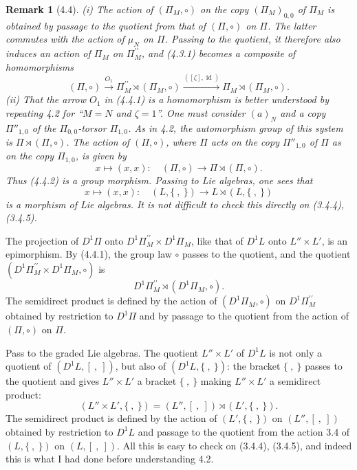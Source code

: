 \documentclass[10pt,a4paper]{article}
\newcommand{\Id}{\operatorname{id}}
\theoremstyle{deligne}
\newtheorem*{remark*}{Remark}
\newcommand{\heading}[1]{\vspace{0.65em}\noindent{\bfseries #1}\quad}
\begin{document}
\begin{remark*}[4.4]
(i) The action of \((\Pi_M,\circ)\) on the copy \((\Pi_M)_{0,0}\) of \(\Pi_M\) is obtained by passage to the quotient from that of \((\Pi,\circ)\) on \(\Pi\). The latter commutes with the action of \(\mu_N\) on \(\Pi\). Passing to the quotient, it therefore also induces an action of \(\Pi_M\) on \(\Pi_M^{\prime\prime}\), and (4.3.1) becomes a composite of homomorphisms
\[
\tag{4.4.1}
(\Pi,\circ)\overset{O_1}{\longrightarrow}\Pi_M^{\prime\prime}\rtimes(\Pi_M,\circ)
\overset{([\zeta],\Id)}{\longrightarrow}\Pi_M\rtimes(\Pi_M,\circ).
\]
(ii) That the arrow \(O_1\) in (4.4.1) is a homomorphism is better understood by repeating 4.2 for ``\(M=N\) and \(\zeta=1\)''. One must consider \((a)_N\) and a copy \(\Pi''_{1,0}\) of the \(\Pi_{0,0}\)-torsor \(\Pi_{1,0}\). As in 4.2, the automorphism group of this system is \(\Pi\rtimes(\Pi,\circ)\). The action of \((\Pi,\circ)\), where \(\Pi\) acts on the copy \(\Pi''_{1,0}\) of \(\Pi\) as on the copy \(\Pi_{1,0}\), is given by
\[
\tag{4.4.2}
x\longmapsto(x,x):\quad (\Pi,\circ)\longrightarrow\Pi\rtimes(\Pi,\circ).
\]
Thus (4.4.2) is a group morphism. Passing to Lie algebras, one sees that
\[
\tag{4.4.3}
x\longmapsto(x,x):\quad (L,\{\ ,\ \})\longrightarrow L\rtimes(L,\{\ ,\ \})
\]
is a morphism of Lie algebras. It is not difficult to check this directly on (3.4.4), (3.4.5).
\end{remark*}

\heading{4.5.} The projection of \(D^1\Pi\) onto \(D^1\Pi_M^{\prime\prime}\times D^1\Pi_M\), like that of \(D^1L\) onto \(L''\times L'\), is an epimorphism. By (4.4.1), the group law \(\circ\) passes to the quotient, and the quotient \((D^1\Pi_M^{\prime\prime}\times D^1\Pi_M,\circ)\) is
\[
D^1\Pi_M^{\prime\prime}\rtimes(D^1\Pi_M,\circ).
\]
The semidirect product is defined by the action of \((D^1\Pi_M,\circ)\) on \(D^1\Pi_M^{\prime\prime}\) obtained by restriction to \(D^1\Pi\) and by passage to the quotient from the action of \((\Pi,\circ)\) on \(\Pi\).

Pass to the graded Lie algebras. The quotient \(L''\times L'\) of \(D^1L\) is not only a quotient of \((D^1L,[\ ,\ ])\), but also of \((D^1L,\{\ ,\ \})\): the bracket \(\{\ ,\ \}\) passes to the quotient and gives \(L''\times L'\) a bracket \(\{\ ,\ \}\) making \(L''\times L'\) a semidirect product:
\[
(L''\times L',\{\ ,\ \})=(L'',[\ ,\ ])\rtimes(L',\{\ ,\ \}).
\]
The semidirect product is defined by the action of \((L',\{\ ,\ \})\) on \((L'',[\ ,\ ])\) obtained by restriction to \(D^1L\) and passage to the quotient from the action 3.4 of \((L,\{\ ,\ \})\) on \((L,[\ ,\ ])\). All this is easy to check on (3.4.4), (3.4.5), and indeed this is what I had done before understanding 4.2.
\end{document}
